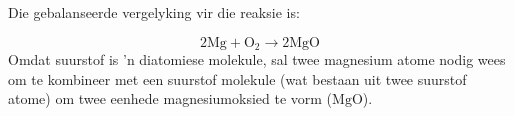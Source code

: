         \label{m38684*id138529}Die gebalanseerde vergelyking vir die reaksie is:\par 
        \label{m38684*id138535}\nopagebreak\noindent{}
    \begin{equation*}
    2\text{Mg}+{\text{O}}_{2}\to 2\text{MgO}
      \end{equation*}
Omdat suurstof is 'n diatomiese molekule, sal twee magnesium atome nodig wees om te kombineer met een suurstof molekule (wat bestaan uit twee suurstof atome) om twee eenhede magnesiumoksied te vorm ($\text{MgO}$).\\
% 
% 
% 			
% 		
% 		
% 	

